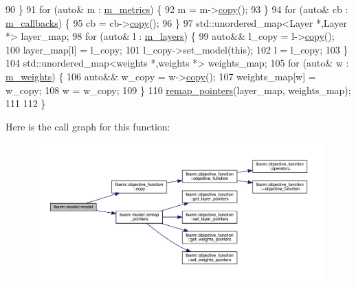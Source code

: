 \begin{DoxyCode}
90   \}
91   \textcolor{keywordflow}{for} (\textcolor{keyword}{auto}& m : \hyperlink{classlbann_1_1model_ae75c9aafe9e5a93980cc1bbae986bc79}{m\_metrics}) \{
92     m = m->\hyperlink{classlbann_1_1objective__function_a8ab03f0dc1d2c067b895f5859bacd810}{copy}();
93   \}
94   \textcolor{keywordflow}{for} (\textcolor{keyword}{auto}& cb : \hyperlink{classlbann_1_1model_a07b511fef30368494c2ad80922ffd0eb}{m\_callbacks}) \{
95     cb = cb->\hyperlink{classlbann_1_1objective__function_a8ab03f0dc1d2c067b895f5859bacd810}{copy}();
96   \}
97   std::unordered\_map<Layer *,Layer *> layer\_map;
98   \textcolor{keywordflow}{for} (\textcolor{keyword}{auto}& l : \hyperlink{classlbann_1_1model_a0229fc226ec163d1411548446104569d}{m\_layers}) \{
99     \textcolor{keyword}{auto}&& l\_copy = l->\hyperlink{classlbann_1_1objective__function_a8ab03f0dc1d2c067b895f5859bacd810}{copy}();
100     layer\_map[l] = l\_copy;
101     l\_copy->set\_model(\textcolor{keyword}{this});
102     l = l\_copy;
103   \}
104   std::unordered\_map<weights *,weights *> weights\_map;
105   \textcolor{keywordflow}{for} (\textcolor{keyword}{auto}& w : \hyperlink{classlbann_1_1model_aaf9adefe4497d90bf5bc2567e71bfb00}{m\_weights}) \{
106     \textcolor{keyword}{auto}&& w\_copy = w->\hyperlink{classlbann_1_1objective__function_a8ab03f0dc1d2c067b895f5859bacd810}{copy}();
107     weights\_map[w] = w\_copy;
108     w = w\_copy;
109   \}
110   \hyperlink{classlbann_1_1model_ac6cc0f5d850cfb997bbbc70eefa0d68f}{remap\_pointers}(layer\_map, weights\_map);
111 
112 \}
\end{DoxyCode}
Here is the call graph for this function\+:\nopagebreak
\begin{figure}[H]
\begin{center}
\leavevmode
\includegraphics[width=350pt]{classlbann_1_1model_a03fd1dc3edddb414b040bc009cf73371_cgraph}
\end{center}
\end{figure}
\mbox{\label{classlbann_1_1model_ae97a8048de182af3ed8a6fbd92212958}} 
